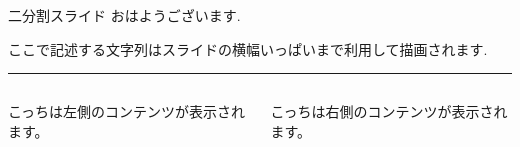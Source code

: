 \begin{frame}[fragile]{二分割スライド}
    おはようございます. \par
    ここで記述する文字列はスライドの横幅いっぱいまで利用して描画されます.\par

    \noindent\rule[7pt]{\linewidth}{0.4pt}
    
    \lstset{basicstyle=\tiny}

    \begin{columns}
        \begin{column}{0.5\linewidth}
            こっちは左側のコンテンツが表示されます。
        \end{column}
        \begin{column}{0.5\linewidth}
            こっちは右側のコンテンツが表示されます。
        \end{column}
    \end{columns}
\end{frame}